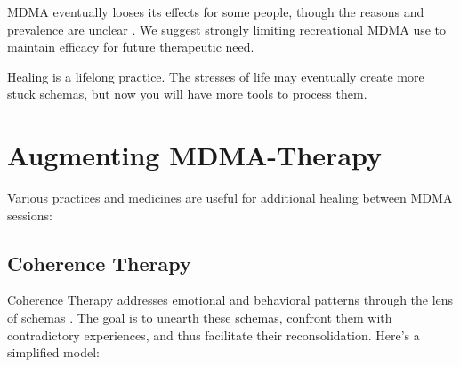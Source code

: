 \documentclass[12pt,letterpaper]{article}
\begin{document}
MDMA eventually looses its effects for some people, though the reasons and prevalence are unclear \cite{parrottTolerance}. We suggest strongly limiting recreational MDMA use to maintain efficacy for future therapeutic need.

Healing is a lifelong practice. The stresses of life may eventually create more stuck schemas, but now you will have more tools to process them.
\section{Augmenting MDMA-Therapy}
\label{healingPractices}
Various practices and medicines are useful for additional healing between MDMA sessions:
\subsection{Coherence Therapy}
Coherence Therapy addresses emotional and behavioral patterns through the lens of schemas \cite{eckerUnlocking}. The goal is to unearth these schemas, confront them with contradictory experiences, and thus facilitate their reconsolidation. Here's a simplified model:
\end{document}
